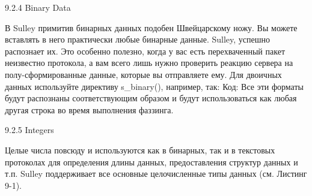 \documentclass[12pt, a4paper, oneside]{book}
\begin{document}
9.2.4 Binary Data

В Sulley примитив бинарных данных подобен Швейцарскому ножу. Вы можете вставлять в него практически любые бинарные данные. Sulley, успешно распознает их. Это особенно полезно, когда у вас есть перехваченный пакет неизвестно протокола, а вам всего лишь нужно проверить реакцию сервера на полу-сформированные данные, которые вы отправляете ему. Для двоичных данных используйте директиву s\_binary(), например, так:
Код:
Все эти форматы будут распознаны соответствующим образом и будут использоваться как любая другая строка во время выполнения фаззинга. 

9.2.5 Integers

Целые числа повсюду и используются как в бинарных, так и в текстовых протоколах для определения длины данных, предоставления структур данных и т.п. Sulley поддерживает все основные целочисленные типы данных (см. Листинг 9-1).
\end{document}
